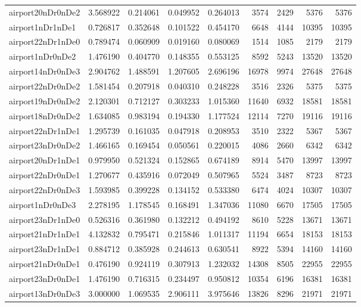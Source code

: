 \begin{longtable}{|l|r|r|r|r|r|r|r|r|}
airport20nDr0nDe2 & 3.568922 & 0.214061 & 0.049952 & 0.264013 & 3574 & 2429 & 5376 & 5376 \\
airport1nDr1nDe1 & 0.726817 & 0.352648 & 0.101522 & 0.454170 & 6648 & 4144 & 10395 & 10395 \\
airport22nDr1nDe0 & 0.789474 & 0.060909 & 0.019160 & 0.080069 & 1514 & 1085 & 2179 & 2179 \\
airport1nDr0nDe2 & 1.476190 & 0.404770 & 0.148355 & 0.553125 & 8592 & 5243 & 13520 & 13520 \\
airport14nDr0nDe3 & 2.904762 & 1.488591 & 1.207605 & 2.696196 & 16978 & 9974 & 27648 & 27648 \\
airport22nDr0nDe2 & 1.581454 & 0.207918 & 0.040310 & 0.248228 & 3516 & 2326 & 5375 & 5375 \\
airport19nDr0nDe2 & 2.120301 & 0.712127 & 0.303233 & 1.015360 & 11640 & 6932 & 18581 & 18581 \\
airport18nDr0nDe2 & 1.634085 & 0.983194 & 0.194330 & 1.177524 & 12114 & 7270 & 19116 & 19116 \\
airport22nDr1nDe1 & 1.295739 & 0.161035 & 0.047918 & 0.208953 & 3510 & 2322 & 5367 & 5367 \\
airport23nDr0nDe2 & 1.466165 & 0.169454 & 0.050561 & 0.220015 & 4086 & 2660 & 6342 & 6342 \\
airport20nDr1nDe1 & 0.979950 & 0.521324 & 0.152865 & 0.674189 & 8914 & 5470 & 13997 & 13997 \\
airport22nDr0nDe1 & 1.270677 & 0.435916 & 0.072049 & 0.507965 & 5524 & 3487 & 8723 & 8723 \\
airport22nDr0nDe3 & 1.593985 & 0.399228 & 0.134152 & 0.533380 & 6474 & 4024 & 10307 & 10307 \\
airport1nDr0nDe3 & 2.278195 & 1.178545 & 0.168491 & 1.347036 & 11080 & 6670 & 17505 & 17505 \\
airport23nDr1nDe0 & 0.526316 & 0.361980 & 0.132212 & 0.494192 & 8610 & 5228 & 13671 & 13671 \\
airport21nDr1nDe1 & 4.132832 & 0.795471 & 0.215846 & 1.011317 & 11194 & 6654 & 18153 & 18153 \\
airport23nDr1nDe1 & 0.884712 & 0.385928 & 0.244613 & 0.630541 & 8922 & 5394 & 14160 & 14160 \\
airport21nDr0nDe1 & 0.476190 & 0.924119 & 0.307913 & 1.232032 & 14308 & 8505 & 22955 & 22955 \\
airport23nDr0nDe1 & 1.476190 & 0.716315 & 0.234497 & 0.950812 & 10354 & 6196 & 16381 & 16381 \\
airport13nDr0nDe3 & 3.000000 & 1.069535 & 2.906111 & 3.975646 & 13826 & 8296 & 21971 & 21971 \\

\end{longtable}
